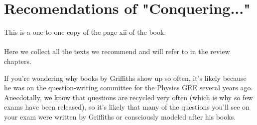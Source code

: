 \section{Recomendations of "Conquering..."}
This is a one-to-one copy of the page xii of the book:\\
\\
Here we collect all the texts we recommend and will refer
to in the review chapters. 

If you're wondering why books by Griffiths show up so often, it's likely because he was on the question-writing committee for the Physics GRE several years ago. Anecdotally, we know that questions are recycled very
often (which is why so few exams have been released), so it's likely that many of the questions you'll see on your exam were written by Griffiths or consciously modeled after his books.

